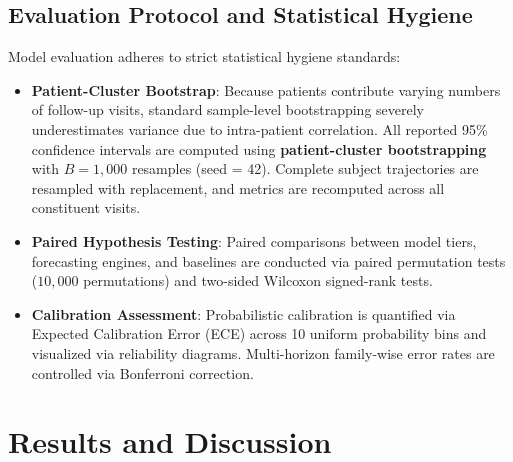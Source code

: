 \documentclass[11pt,a4paper]{article}
\begin{document}
\subsection{Evaluation Protocol and Statistical Hygiene}
\label{sec:method_eval_protocol}
Model evaluation adheres to strict statistical hygiene standards:
\begin{itemize}
    \item \textbf{Patient-Cluster Bootstrap}: Because patients contribute varying numbers of follow-up visits, standard sample-level bootstrapping severely underestimates variance due to intra-patient correlation. All reported 95\% confidence intervals are computed using \textbf{patient-cluster bootstrapping} with $B = 1,000$ resamples (seed = 42). Complete subject trajectories are resampled with replacement, and metrics are recomputed across all constituent visits.
    \item \textbf{Paired Hypothesis Testing}: Paired comparisons between model tiers, forecasting engines, and baselines are conducted via paired permutation tests ($10,000$ permutations) and two-sided Wilcoxon signed-rank tests.
    \item \textbf{Calibration Assessment}: Probabilistic calibration is quantified via Expected Calibration Error (ECE) across 10 uniform probability bins and visualized via reliability diagrams. Multi-horizon family-wise error rates are controlled via Bonferroni correction.
\end{itemize}

\FloatBarrier



\section{Results and Discussion}
\label{sec:results}
\end{document}
